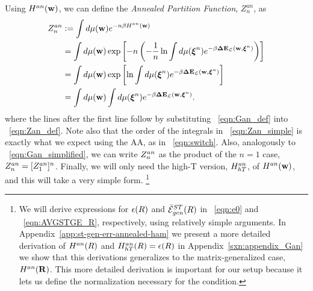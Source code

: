 {Using $H^{an}({\mathbf{w}})$, we can define the \emph{Annealed Partition Function}, $Z^{an}_{n}$, as
\begin{align}
  \label{eqn:Zan_def}
  Z^{an}_{n} 
  &:=  \int d\mu({\mathbf{w}}) e^{-n\beta H^{an}({\mathbf{w}})} \\ \nonumber
  &=\int d\mu({\mathbf{w}}) \exp\left[-n \left(- \frac{1}{n}\ln  \int d\mu(\boldsymbol{\xi}^{n})e^{-\beta\mathbf{\Delta {E}}_{\mathcal{L}}(\mathbf{w}, \boldsymbol{\xi}^{n})}\right)\right] \\ \nonumber
  &=  \int d\mu({\mathbf{w}}) \exp\left[\ln  \int d\mu(\boldsymbol{\xi}^{n})e^{-\beta\mathbf{\Delta {E}}_{\mathcal{L}}(\mathbf{w}, \boldsymbol{\xi}^{n})}\right] \\ 
  \label{eqn:Zan_simple}
  &=  \int d\mu({\mathbf{w}})  \int d\mu(\boldsymbol{\xi}^{n})e^{-\beta\mathbf{\Delta {E}}_{\mathcal{L}}(\mathbf{w}, \boldsymbol{\xi}^{n})} .
\end{align}
where the lines after the first line follow by substituting \EQN~\ref{eqn:Gan_def} into \EQN~\ref{eqn:Zan_def}.
Note also that the order of the integrals in \EQN~\ref{eqn:Zan_simple} is exactly what we expect using the AA, as in \EQN~\ref{eqn:switch}.
Also, analogously to \EQN~\ref{eqn:Gan_simplified}, we can write $Z^{an}_{n}$ as the product of the $n=1$ case, $Z^{an}_{n}=[Z^{an}_{1}]^{n}$.
Finally, we will only need the high-T version, $H^{an}_{hT}$, of $H^{an}({\mathbf{w}})$, and this will take a very simple form.
\footnote{We will derive expressions for $\epsilon(R)$ and $\bar{\mathcal{E}}^{ST}_{gen}(R)$ in \EQN~\ref{eqn:e0} and \EQN~\ref{eqn:AVGSTGE_R}, respectively, using relatively simple arguments.
In Appendix~\ref{app:st-gen-err-annealed-ham} we present
a more detailed derivation of $H^{an}(R)$ and $H^{an}_{hT}(R)=\epsilon(R)$
in Appendix~\ref{sxn:appendix_Gan} we show that this derivations generalizes to the matrix-generalized case, $H^{an}(\mathbf{R})$.
This more detailed derivation is important for our \SETOL setup because it lets us define the normalization
necessary for the \TRACELOG condition.
}



}
